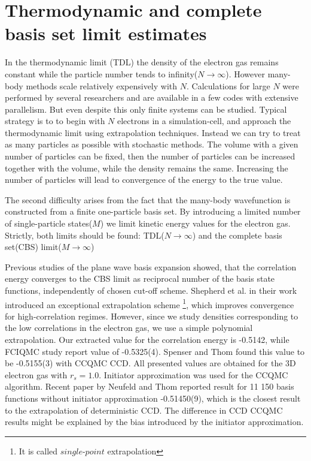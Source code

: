 \documentclass[twoside,english]{uiofysmaster}
\begin{document}
\section{Thermodynamic and complete basis set limit estimates}

In the thermodynamic limit (TDL) the density of the electron gas
remains constant while the particle number tends to
infinity($N\rightarrow \infty$). However many-body methods scale
relatively expensively with $N$. Calculations for large $N$ were
performed by several researchers and are available in a few codes with
extensive parallelism. But even despite this only finite systems can
be studied. Typical strategy is to to begin with $N$ electrons in a
simulation-cell, and approach the thermodynamic limit using
extrapolation techniques. Instead we can try to treat as many
particles as possible with stochastic methods. The volume with a given
number of particles can be fixed, then the number of particles can be
increased together with the volume, while the density remains the
same. Increasing the number of particles will lead to convergence of the
energy to the true value.

The second difficulty arises from the fact that the many-body
wavefunction is constructed from a finite one-particle basis set. By
introducing a limited number of single-particle states($M$) we limit
kinetic energy values for the electron gas. Strictly, both limits
should be found: TDL($N\rightarrow \infty$) and the complete basis
set(CBS) limit($M \rightarrow \infty$)

Previous studies \cite{ShepherdConvergencemanybodywavefunction2012} of
the plane wave basis expansion showed, that the correlation energy
converges to the CBS limit as reciprocal number of the basis state
functions, independently of chosen cut-off scheme. Shepherd et al. in
their work introduced an exceptional extrapolation scheme \footnote{It
	is called $single$-$point$ extrapolation}, which improves
convergence for high-correlation regimes. However, since we study
densities corresponding to the low correlations in the electron gas,
we use a simple polynomial extrapolation. Our extracted value for the
correlation energy is -0.5142, while FCIQMC study report
\cite{ShepherdInvestigationfullconfiguration2012} value of
-0.5325(4). Spenser and
Thom\cite{SpencerDevelopmentsstochasticcoupled2016} found this value
to be -0.5155(3) with CCQMC CCD. All presented values are obtained for
the 3D electron gas with $r_s=1.0$. Initiator approximation was used
for the CCQMC algorithm. Recent paper by Neufeld and
Thom\cite{Neufeldstudydenseuniform2017} reported result for 11 150
basis functions without initiator approximation -0.51450(9), which is
the closest result to the extrapolation of deterministic CCD. The
difference in CCD CCQMC results might be explained by the bias
introduced by the initiator approximation.
\end{document}
